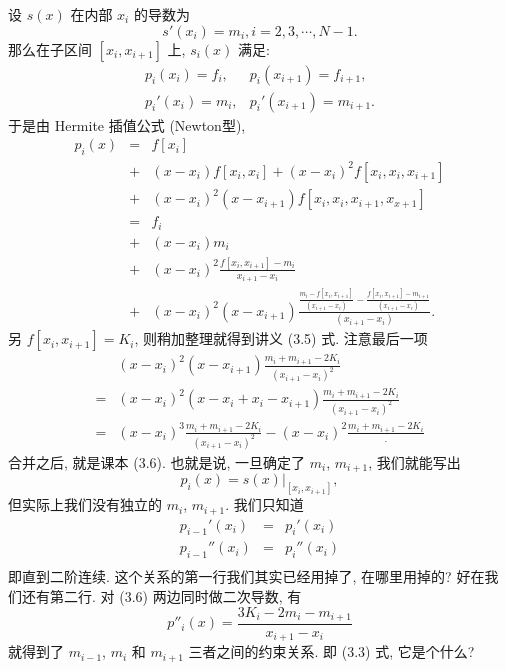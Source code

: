 \documentclass[a4paper]{ctexart}
\begin{document}
设 $s(x)$ 在内部 $x_i$ 的导数为
$$
s'(x_i) = m_i, i = 2, 3, \cdots, N - 1.
$$
那么在子区间 $[x_{i}, x_{i + 1}]$ 上, $s_i(x)$ 满足:
$$
\begin{array}{ll}
p_i(x_i) = f_i, &p_i(x_{i + 1}) = f_{i + 1},\\
p_i'(x_i) = m_i, &p_i'(x_{i + 1}) = m_{i + 1}.
\end{array}
$$
于是由 Hermite 插值公式 (Newton型), 
$$
\begin{array}{rcl}
  p_i(x) &=& f[x_i]\\
  &+& (x - x_i)f[x_i, x_i] + (x - x_i)^2f[x_i, x_i, x_{i + 1}]\\
  &+& (x - x_i)^2(x - x_{i + 1})f[x_i, x_i, x_{i + 1}, x_{x + 1}] \\
  &=& f_i\\
  &+& (x - x_i)m_i\\
  &+& (x - x_i)^2 \frac{f[x_i, x_{i + 1}] - m_i}{x_{i + 1} - x_i}\\
  &+& (x - x_i)^2(x - x_{i + 1}) \frac{
  \frac{m_i - f[x_i, x_{i + 1}]}{(x_{i + 1} - x_i)}
  - \frac{f[x_i, x_{i + 1}] - m_{i + 1}}{(x_{i + 1} - x_i)}}{(x_{i + 1} - x_i)}.
\end{array}
$$
另 $f[x_i, x_{i + 1}] = K_i$, 则稍加整理就得到讲义 (3.5) 式. 
注意最后一项
$$
\begin{array}{ll}
&(x - x_i)^2(x - x_{i + 1}) 
\frac{m_i + m_{i + 1} - 2 K_i}{(x_{i + 1} - x_i)^2}\\
=&(x - x_i)^2(x - x_i + x_i - x_{i + 1})
\frac{m_i + m_{i + 1} - 2 K_i}{(x_{i + 1} - x_i)^2}\\
=&(x - x_i)^3\frac{m_i + m_{i + 1} - 2 K_i}{(x_{i + 1} - x_i)^2}
- (x - x_i)^2 \frac{m_i + m_{i + 1} - 2 K_i}.
\end{array}
$$
合并之后, 就是课本 (3.6). 
也就是说, 一旦确定了 $m_i$, $m_{i + 1}$, 我们就能写出
$$
p_i(x) = \left.s(x)\right|_{[x_i, x_{i + 1}]},
$$
但实际上我们没有独立的 $m_i$, $m_{i + 1}$. 我们只知道
$$
\begin{array}{rcl}
  p_{i - 1}'(x_i) &=& p_i'(x_i) \\
  p_{i - 1}''(x_i) &=& p_i''(x_i) \\
\end{array}
$$
即直到二阶连续. 这个关系的第一行我们其实已经用掉了, 在哪里用掉的?
好在我们还有第二行. 对 (3.6) 两边同时做二次导数, 有
$$
p''_i(x) = \frac{3 K_i - 2 m_i - m_{i + 1}}{x_{i + 1} - x_i}
$$
就得到了 $m_{i - 1}$, $m_i$ 和 $m_{i + 1}$ 三者之间的约束关系. 
即 (3.3) 式, 它是个什么?
\end{document}

